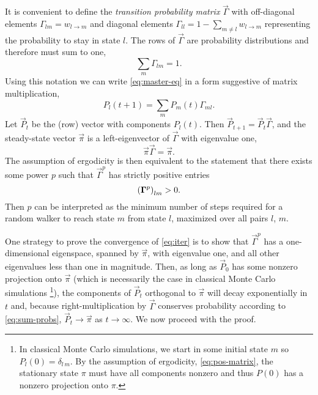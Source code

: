 It is convenient to define the \emph{transition probability matrix}
$\vec{\Gamma}$ with off-diagonal elements $\Gamma_{lm} = w_{l \to m}$ and
diagonal elements $\Gamma_{ll} = 1 - \sum_{m \neq l} w_{l \to m}$ representing
the probability to stay in state $l$. The rows of $\vec{\Gamma}$ are
probability distributions and therefore must sum to one,
\begin{equation}
  \sum_m \Gamma_{lm} = 1.
  \label{eq:sum-probs}
\end{equation}
Using this notation we can write \cref{eq:master-eq} in a form suggestive of
matrix multiplication,
\begin{equation}
  P_l(t+1) = \sum_m P_m(t) \Gamma_{ml}.
  \label{eq:iter}
\end{equation}
Let $\vec{P}_t$ be the (row) vector with components $P_l(t)$. Then
$\vec{P}_{t+1} = \vec{P}_t \vec{\Gamma}$, and the steady-state vector
$\vec{\pi}$ is a left-eigenvector of $\vec{\Gamma}$ with eigenvalue one,
\begin{equation}
  \vec{\pi}\vec{\Gamma} = \vec{\pi}.
\end{equation}
The assumption of ergodicity is then equivalent to the
statement that there exists some power $p$ such that $\vec{\Gamma}^p$ has
strictly positive entries
\begin{equation}
  \left(\bm{\Gamma}^p\right)_{lm} > 0.
  \label{eq:pos-matrix}
\end{equation}
Then $p$ can be interpreted as the minimum number of steps required for a
random walker to reach state $m$ from state $l$, maximized over all pairs $l$,
$m$.

One strategy to prove the convergence of \cref{eq:iter} is to show that
$\vec{\Gamma}^p$ has a one-dimensional eigenspace, spanned by $\vec{\pi}$, with
eigenvalue one, and all other eigenvalues less than one in magnitude. Then, as
long as $\vec{P}_0$ has
some nonzero projection onto $\vec{\pi}$ (which is necessarily the case in
classical Monte Carlo simulations%
\footnote{%
  In classical Monte Carlo simulations, we start in some initial state $m$ so
  $P_l(0)=\delta_{l\,m}$. By the assumption of ergodicity,
  \cref{eq:pos-matrix}, the stationary state $\pi$ must have all components
  nonzero and thus $P(0)$ has a nonzero projection onto $\pi$.
}),
the components of $\vec{P}_t$ orthogonal to $\vec{\pi}$ will decay
exponentially in $t$ and, because right-multiplication by $\vec{\Gamma}$
conserves probability according to \cref{eq:sum-probs}, $\vec{P}_t \to
\vec{\pi}$ as $t \to \infty$. We now proceed with the proof.

